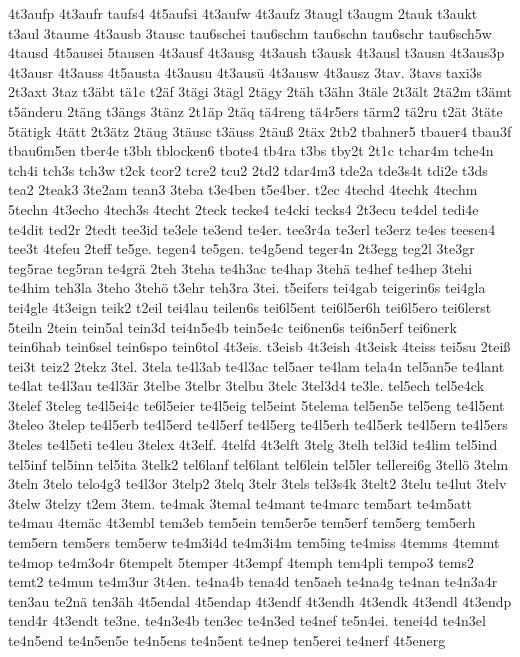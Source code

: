 {4t3aufp
4t3aufr
taufs4
4t5aufsi
4t3aufw
4t3aufz
3taugl
t3augm
2tauk
t3aukt
t3aul
3taume
4t3ausb
3tausc
tau6schei
tau6schm
tau6schn
tau6schr
tau6sch5w
4tausd
4t5ausei
5tausen
4t3ausf
4t3ausg
4t3aush
t3ausk
4t3ausl
t3ausn
4t3aus3p
4t3ausr
4t3auss
4t5austa
4t3ausu
4t3ausü
4t3ausw
4t3ausz
3tav.
3tavs
taxi3s
2t3axt
3taz
t3äbt
tä1c
t2äf
3tägi
3tägl
2tägy
2täh
t3ähn
3täle
2t3ält
2tä2m
t3ämt
t5änderu
2täng
t3ängs
3tänz
2t1äp
2täq
tä4reng
tä4r5ers
tärm2
tä2ru
t2ät
3täte
5tätigk
4tätt
2t3ätz
2täug
3täusc
t3äuss
2täuß
2täx
2tb2
tbahner5
tbauer4
tbau3f
tbau6m5en
tber4e
t3bh
tblocken6
tbote4
tb4ra
t3bs
tby2t
2t1c
tchar4m
tche4n
tch4i
tch3s
tch3w
t2ck
tcor2
tcre2
tcu2
2td2
tdar4m3
tde2a
tde3s4t
tdi2e
t3ds
tea2
2teak3
3te2am
tean3
3teba
t3e4ben
t5e4ber.
t2ec
4techd
4techk
4techm
5techn
4t3echo
4tech3s
4techt
2teck
tecke4
te4cki
tecks4
2t3ecu
te4del
tedi4e
te4dit
ted2r
2tedt
tee3id
te3ele
te3end
te4er.
tee3r4a
te3erl
te3erz
te4es
teesen4
tee3t
4tefeu
2teff
te5ge.
tegen4
te5gen.
te4g5end
teger4n
2t3egg
teg2l
3te3gr
teg5rae
teg5ran
te4grä
2teh
3teha
te4h3ac
te4hap
3tehä
te4hef
te4hep
3tehi
te4him
teh3la
3teho
3tehö
t3ehr
teh3ra
3tei.
t5eifers
tei4gab
teigerin6s
tei4gla
tei4gle
4t3eign
teik2
t2eil
tei4lau
teilen6s
tei6l5ent
tei6l5er6h
tei6l5ero
tei6lerst
5teiln
2tein
tein5al
tein3d
tei4n5e4b
tein5e4c
tei6nen6s
tei6n5erf
tei6nerk
tein6hab
tein6sel
tein6spo
tein6tol
4t3eis.
t3eisb
4t3eish
4t3eisk
4teiss
tei5su
2teiß
tei3t
teiz2
2tekz
3tel.
3tela
te4l3ab
te4l3ac
tel5aer
te4lam
tela4n
tel5an5e
te4lant
te4lat
te4l3au
te4l3är
3telbe
3telbr
3telbu
3telc
3tel3d4
te3le.
tel5ech
tel5e4ck
3telef
3teleg
te4l5ei4c
te6l5eier
te4l5eig
tel5eint
5telema
tel5en5e
tel5eng
te4l5ent
3teleo
3telep
te4l5erb
te4l5erd
te4l5erf
te4l5erg
te4l5erh
te4l5erk
te4l5ern
te4l5ers
3teles
te4l5eti
te4leu
3telex
4t3elf.
4telfd
4t3elft
3telg
3telh
tel3id
te4lim
tel5ind
tel5inf
tel5inn
tel5ita
3telk2
tel6lanf
tel6lant
tel6lein
tel5ler
tellerei6g
3tellö
3telm
3teln
3telo
telo4g3
te4l3or
3telp2
3telq
3telr
3tels
tel3s4k
3telt2
3telu
te4lut
3telv
3telw
3telzy
t2em
3tem.
te4mak
3temal
te4mant
te4marc
tem5art
te4m5att
te4mau
4temäc
4t3embl
tem3eb
tem5ein
tem5er5e
tem5erf
tem5erg
tem5erh
tem5ern
tem5ers
tem5erw
te4m3i4d
te4m3i4m
tem5ing
te4miss
4temms
4temmt
te4mop
te4m3o4r
6tempelt
5temper
4t3empf
4temph
tem4pli
tempo3
tems2
temt2
te4mun
te4m3ur
3t4en.
te4na4b
tena4d
ten5aeh
te4na4g
te4nan
te4n3a4r
ten3au
te2nä
ten3äh
4t5endal
4t5endap
4t3endf
4t3endh
4t3endk
4t3endl
4t3endp
tend4r
4t3endt
te3ne.
te4n3e4b
ten3ec
te4n3ed
te4nef
te5n4ei.
tenei4d
te4n3el
te4n5end
te4n5en5e
te4n5ens
te4n5ent
te4nep
ten5erei
te4nerf
4t5energ
}
